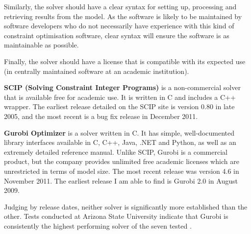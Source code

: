 Similarly, the solver should have a clear syntax for setting up, processing
and retrieving results from the model. As the software is likely to be
maintained by software developers who do not necessarily have experience with
this kind of constraint optimisation software, clear syntax will ensure the
software is as maintainable as possible.

Finally, the solver should have a license that is compatible with its expected
use (in centrally maintained software at an academic institution).

\textbf{SCIP (Solving Constraint Integer Programs)} is a non-commercial solver
that is available free for academic use. It is written in C and includes a C++
wrapper. The earliest release detailed on the SCIP site is version 0.80 in
late 2005, and the most recent is a bug fix release in December 2011.

\textbf{Gurobi Optimizer} is a solver written in C. It has simple,
well-documented library interfaces available in C, C++, Java, .NET and Python,
as well as an extremely detailed reference manual. Unlike SCIP, Gurobi is a
commercial product, but the company provides unlimited free academic licenses
which are unrestricted in terms of model size. The most recent release was
version 4.6 in November 2011. The earliest release I am able to find is Gurobi
2.0 in August 2009.

Judging by release dates, neither solver is significantly more established
than the other. Tests conducted at Arizona State University indicate that
Gurobi is consistently the highest performing solver of the seven tested
\cite{SolversPerformance_2012}.
